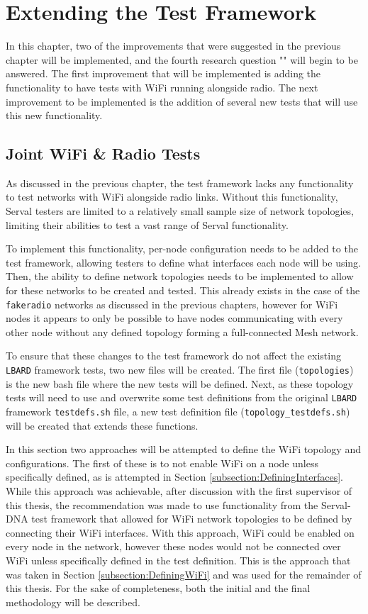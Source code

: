 
\chapter{Extending the Test Framework} %
\label{Chapter4}
In this chapter, two of the improvements that were suggested in the previous chapter will be implemented, and the fourth research question "\fourthRQ" will begin to be answered.
The first improvement that will be implemented is adding the functionality to have tests with WiFi running alongside radio.
The next improvement to be implemented is the addition of several new tests that will use this new functionality.

\section{Joint WiFi \& Radio Tests}
As discussed in the previous chapter, the test framework lacks any functionality to test networks with WiFi alongside radio links. 
Without this functionality, Serval testers are limited to a relatively small sample size of network topologies, limiting their abilities to test a vast range of Serval functionality.

To implement this functionality, per-node configuration needs to be added to the test framework, allowing testers to define what interfaces each node will be using.
Then, the ability to define network topologies needs to be implemented to allow for these networks to be created and tested.
This already exists in the case of the \texttt{fakeradio} networks as discussed in the previous chapters, however for WiFi nodes it appears to only be possible to have nodes communicating with every other node without any defined topology forming a full-connected Mesh network.

To ensure that these changes to the test framework do not affect the existing \texttt{LBARD} framework tests, two new files will be created.
The first file (\texttt{topologies}) is the new bash file where the new tests will be defined.
Next, as these topology tests will need to use  and overwrite some test definitions from the original \texttt{LBARD} framework \texttt{testdefs.sh} file, a new test definition file (\texttt{topology\_testdefs.sh}) will be created that extends these functions.

In this section two approaches will be attempted to define the WiFi topology and configurations.
The first of these is to not enable WiFi on a node unless specifically defined, as is attempted in Section \ref{subsection:DefiningInterfaces}.
While this approach was achievable, after discussion with the first supervisor of this thesis, the recommendation was made to use functionality from the Serval-DNA test framework that allowed for WiFi network topologies to be defined by connecting their WiFi interfaces.
With this approach, WiFi could be enabled on every node in the network, however these nodes would not be connected over WiFi unless specifically defined in the test definition.
This is the approach that was taken in Section \ref{subsection:DefiningWiFi} and was used for the remainder of this thesis.
For the sake of completeness, both the initial and the final methodology will be described.


